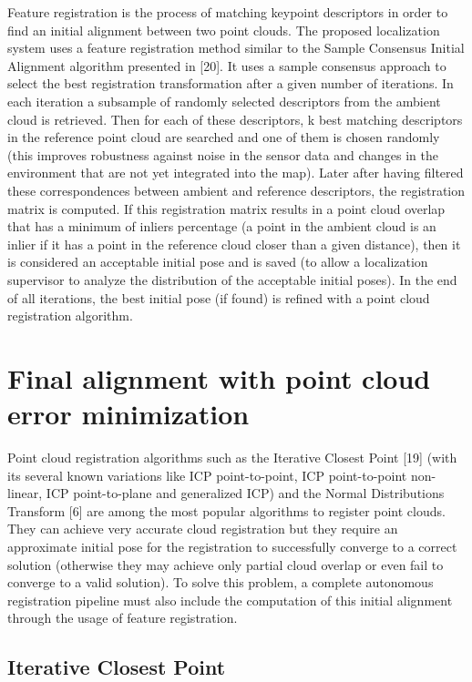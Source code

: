 Feature registration is the process of matching keypoint descriptors in order to find an initial alignment between two point clouds. The proposed localization system uses a feature registration method similar to the Sample Consensus Initial Alignment algorithm presented in [20]. It uses a sample consensus approach to select the best registration transformation after a given number of iterations. In each iteration a subsample of randomly selected descriptors from the ambient cloud is retrieved. Then for each of these descriptors, k best matching descriptors in the reference point cloud are searched and one of them is chosen randomly (this improves robustness against noise in the sensor data and changes in the environment that are not yet integrated into the map). Later after having filtered these correspondences between ambient and reference descriptors, the registration matrix is computed. If this registration matrix results in a point cloud overlap that has a minimum of inliers percentage (a point in the ambient cloud is an inlier if it has a point in the reference cloud closer than a given distance), then it is considered an acceptable initial pose and is saved (to allow a localization supervisor to analyze the distribution of the acceptable initial poses). In the end of all iterations, the best initial pose (if found) is refined with a point cloud registration algorithm.



\section{Final alignment with point cloud error minimization}

Point cloud registration algorithms such as the Iterative Closest Point [19] (with its several known variations like ICP point-to-point, ICP point-to-point non-linear, ICP point-to-plane and generalized ICP) and the Normal Distributions Transform [6] are among the most popular algorithms to register point clouds. They can achieve very accurate cloud registration but they require an approximate initial pose for the registration to successfully converge to a correct solution (otherwise they may achieve only partial cloud overlap or even fail to converge to a valid solution). To solve this problem, a complete autonomous registration pipeline must also include the computation of this initial alignment through the usage of feature registration.


\subsection{Iterative Closest Point}


